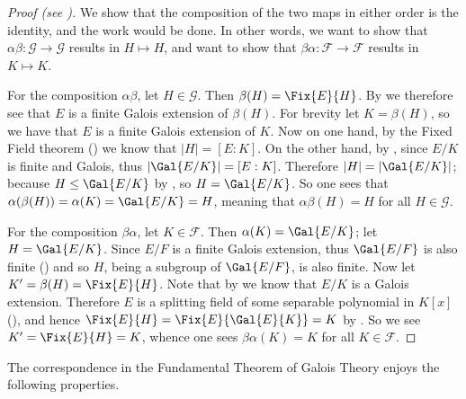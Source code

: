 \begin{proof}[Proof (see {\cite[Theorem 16.7.1]{artin_2011}})]
    We show that the composition of the two maps in either order is the identity, and the work would be done. In other words, we want to show that $\alpha\beta: \mathcal{G} \to \mathcal{G}$ results in $H \mapsto H$, and want to show that $\beta\alpha: \mathcal{F} \to \mathcal{F}$ results in $K \mapsto K$.

    For the composition $\alpha\beta$, let $H \in \mathcal{G}$. Then $\beta(H) = \Fix{E}{H}$. By  we therefore see that $E$ is a finite Galois extension of $\beta(H)$. For brevity let $K = \beta(H)$, so we have that $E$ is a finite Galois extension of $K$. Now on one hand, by the Fixed Field theorem () we know that $|H| = [E:K]$. On the other hand, by , since $E/K$ is finite and Galois, thus $|\Gal{E/K}| = [E:K]$. Therefore $|H| = |\Gal{E/K}|$; because $H \leq \Gal{E/K}$ by , so $H = \Gal{E/K}$. So one sees that $\alpha(\beta(H)) = \alpha(K) = \Gal{E/K} = H$, meaning that $\alpha\beta(H) = H$ for all $H \in \mathcal{G}$.

    For the composition $\beta\alpha$, let $K \in \mathcal{F}$. Then $\alpha(K) = \Gal{E/K}$; let $H = \Gal{E/K}$. Since $E/F$ is a finite Galois extension, thus $\Gal{E/F}$ is also finite () and so $H$, being a subgroup of $\Gal{E/F}$, is also finite. Now let $K' = \beta(H) = \Fix{E}{H}$. Note that by  we know that $E/K$ is a Galois extension. Therefore $E$ is a splitting field of some separable polynomial in $K[x]$ (), and hence $\Fix{E}{H} = \Fix{E}{\Gal{E}{K}} = K$ by . So we see $K' = \Fix{E}{H} = K$, whence one sees $\beta\alpha(K) = K$ for all $K \in \mathcal{F}$.
\end{proof}

The correspondence in the Fundamental Theorem of Galois Theory enjoys the following properties.

